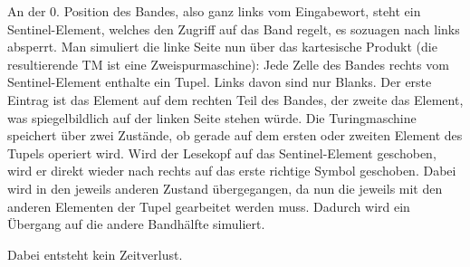 An der 0. Position des Bandes, also ganz links vom Eingabewort, steht ein
Sentinel-Element, welches den Zugriff auf das Band regelt, es sozuagen nach
links absperrt. Man simuliert die linke Seite nun über das kartesische Produkt
(die resultierende TM ist eine Zweispurmaschine): Jede Zelle des Bandes rechts
vom Sentinel-Element enthalte ein Tupel. Links davon sind nur Blanks. Der erste
Eintrag ist das Element auf dem rechten Teil des Bandes, der zweite das Element,
was spiegelbildlich auf der linken Seite stehen würde. Die Turingmaschine
speichert über zwei Zustände, ob gerade auf dem ersten oder zweiten Element des
Tupels operiert wird. Wird der Lesekopf auf das Sentinel-Element geschoben, wird
er direkt wieder nach rechts auf das erste richtige Symbol geschoben. Dabei wird
in den jeweils anderen Zustand übergegangen, da nun die jeweils mit den anderen
Elementen der Tupel gearbeitet werden muss. Dadurch wird ein Übergang auf die
andere Bandhälfte simuliert.

Dabei entsteht kein Zeitverlust.

